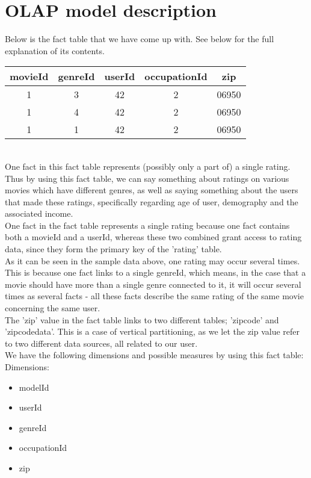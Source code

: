 \section*{OLAP model description}

\noindent Below is the fact table that we have come up with. See below for the full explanation of its contents.

\begin{tabular}{c | c | c | c | c}
  movieId & genreId & userId & occupationId & zip \\
  \hline
  1 & 3 & 42 & 2 & 06950 \\
  1 & 4 & 42 & 2 & 06950 \\
  1 & 1 & 42 & 2 & 06950 \\
  \hline  
\end{tabular} \\

\noindent One fact in this fact table represents (possibly only a part of) a single rating. Thus by using this fact table, we can say something about ratings on various movies which have different genres, as well as saying something about the users that made these ratings, specifically regarding age of user, demography and the associated income. \\
\indent One fact in the fact table represents a single rating because one fact contains both a movieId and a userId, whereas these two combined grant access to rating data, since they form the primary key of the 'rating' table. \\
\indent As it can be seen in the sample data above, one rating may occur several times. This is because one fact links to a single genreId, which means, in the case that a movie should have more than a single genre connected to it, it will occur several times as several facts - all these facts describe the same rating of the same movie concerning the same user. \\
\indent The 'zip' value in the fact table links to two different tables; 'zipcode' and 'zipcodedata'. This is a case of vertical partitioning, as we let the zip value refer to two different data sources, all related to our user. \\

\noindent We have the following dimensions and possible measures by using this fact table: \\
Dimensions:

\begin{itemize}
  \item modelId
  \item userId
  \item genreId
  \item occupationId
  \item zip
\end{itemize}

